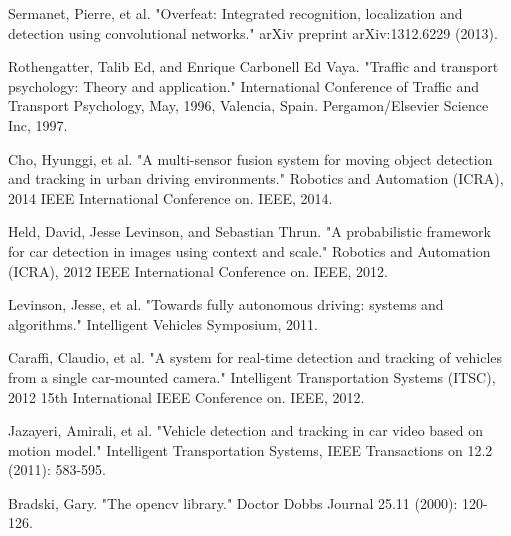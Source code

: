 \documentclass[journal]{IEEEtran}
\begin{document}

%
%
%
\begin{thebibliography}{1}

Sermanet, Pierre, et al. "Overfeat: Integrated recognition, localization and detection using convolutional networks." arXiv preprint arXiv:1312.6229 (2013).

Rothengatter, Talib Ed, and Enrique Carbonell Ed Vaya. "Traffic and transport psychology: Theory and application." International Conference of Traffic and Transport Psychology, May, 1996, Valencia, Spain. Pergamon/Elsevier Science Inc, 1997.

Cho, Hyunggi, et al. "A multi-sensor fusion system for moving object detection and tracking in urban driving environments." Robotics and Automation (ICRA), 2014 IEEE International Conference on. IEEE, 2014.

Held, David, Jesse Levinson, and Sebastian Thrun. "A probabilistic framework for car detection in images using context and scale." Robotics and Automation (ICRA), 2012 IEEE International Conference on. IEEE, 2012.

Levinson, Jesse, et al. "Towards fully autonomous driving: systems and algorithms." Intelligent Vehicles Symposium, 2011. 


Caraffi, Claudio, et al. "A system for real-time detection and tracking of vehicles from a single car-mounted camera." Intelligent Transportation Systems (ITSC), 2012 15th International IEEE Conference on. IEEE, 2012.

Jazayeri, Amirali, et al. "Vehicle detection and tracking in car video based on motion model." Intelligent Transportation Systems, IEEE Transactions on 12.2 (2011): 583-595.

Bradski, Gary. "The opencv library." Doctor Dobbs Journal 25.11 (2000): 120-126.


\end{thebibliography}
\end{document}
